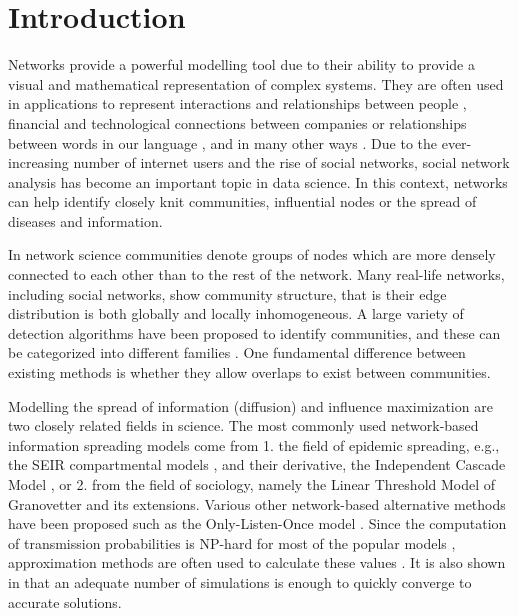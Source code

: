 \documentclass[pdflatex,sn-mathphys-num]{sn-jnl}
\begin{document}


\maketitle

\newpage


\section{Introduction}\label{sec_introduction}

Networks provide a powerful modelling tool due to their ability to provide a visual and mathematical representation of complex systems. They are often used in applications to represent interactions and relationships between people \cite{social}, financial and technological connections between companies \cite{fraud} or relationships between words in our language \cite{words}, and in many other ways \cite{newmanreview}. Due to the ever-increasing number of internet users and the rise of social networks, social network analysis has become an important topic in data science. In this context, networks can help identify closely knit communities, influential nodes or the spread of diseases and information.

In network science communities denote groups of nodes which are more densely connected to each other than to the rest of the network. Many real-life networks, including social networks, show community structure, that is their edge distribution is both globally and locally inhomogeneous. A large variety of detection algorithms have been proposed to identify communities, and these can be categorized into different families \cite{fortunatoreview}. One fundamental difference between existing methods is whether they allow overlaps to exist between communities.

Modelling the spread of information (diffusion) and influence maximization are two closely related fields in science. The most commonly used network-based information spreading models come from 1. the field of epidemic spreading, e.g., the SEIR compartmental models \cite{seir1927, seir2001}, and their derivative, the Independent Cascade Model \cite{domingos, kempe}, or 2. from the field of sociology, namely the Linear Threshold Model of Granovetter \cite{granovetter, kempe} and its extensions. Various other network-based alternative methods have been proposed such as the Only-Listen-Once model \cite{kempe}. Since the computation of transmission probabilities is NP-hard for most of the popular models \cite{kempe, economic}, approximation methods are often used to calculate these values \cite{lisurvey}. It is also shown in \cite{kempe, wasserman} that an adequate number of simulations is enough to quickly converge to accurate solutions.
\end{document}
